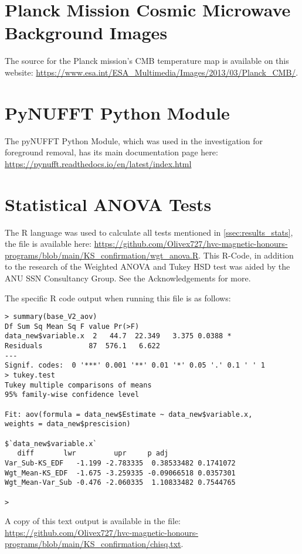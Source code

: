 \section{Planck Mission Cosmic Microwave Background Images}
\label{sec:appendixC}

The source for the Planck mission's CMB temperature map is available on this website: \url{https://www.esa.int/ESA_Multimedia/Images/2013/03/Planck_CMB/}.

\section{PyNUFFT Python Module}
\label{sec:appendixD}

The pyNUFFT Python Module, which was used in the investigation for foreground removal, has its main documentation page here: \url{https://pynufft.readthedocs.io/en/latest/index.html}

\newpage

\section{Statistical ANOVA Tests}
\label{sec:appendixE}

The R language was used to calculate all tests mentioned in \ref{ssec:results_stats}, the file is available here: \url{https://github.com/Olivex727/hvc-magnetic-honours-programs/blob/main/KS_confirmation/wgt_anova.R}. This R-Code, in addition to the research of the Weighted ANOVA and Tukey HSD test was aided by the ANU SSN Consultancy Group. See the Acknowledgements for more.

The specific R code output when running this file is as follows:

\begin{verbatim}
> summary(base_V2_aov)
Df Sum Sq Mean Sq F value Pr(>F)  
data_new$variable.x  2   44.7  22.349   3.375 0.0388 *
Residuals           87  576.1   6.622                 
---
Signif. codes:  0 '***' 0.001 '**' 0.01 '*' 0.05 '.' 0.1 ' ' 1
> tukey.test
Tukey multiple comparisons of means
95% family-wise confidence level

Fit: aov(formula = data_new$Estimate ~ data_new$variable.x,
weights = data_new$prescision)

$`data_new$variable.x`
   diff       lwr         upr     p adj
Var_Sub-KS_EDF   -1.199 -2.783335  0.38533482 0.1741072
Wgt_Mean-KS_EDF  -1.675 -3.259335 -0.09066518 0.0357301
Wgt_Mean-Var_Sub -0.476 -2.060335  1.10833482 0.7544765

> 
\end{verbatim}

A copy of this text output is available in the file: \url{https://github.com/Olivex727/hvc-magnetic-honours-programs/blob/main/KS_confirmation/chisq.txt}.

